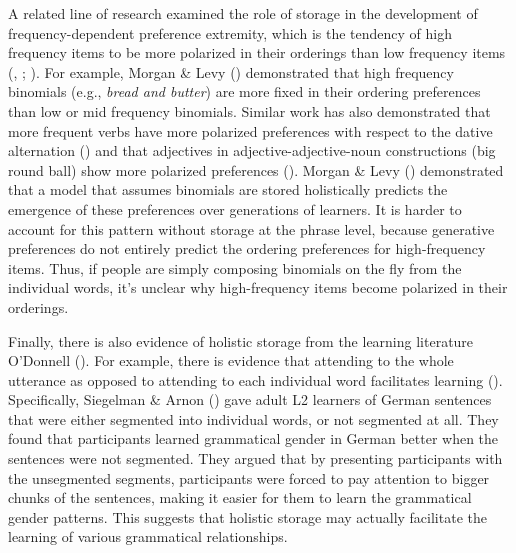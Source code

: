 \documentclass[
  12pt,
  letterpaper,
]{scrreprt}
\begin{document}
A related line of research examined the role of storage in the
development of frequency-dependent preference extremity, which is the
tendency of high frequency items to be more polarized in their orderings
than low frequency items
(,
;
). For example, Morgan \& Levy
()
demonstrated that high frequency binomials (e.g., \emph{bread and
butter}) are more fixed in their ordering preferences than low or mid
frequency binomials. Similar work has also demonstrated that more
frequent verbs have more polarized preferences with respect to the
dative alternation
() and that adjectives in adjective-adjective-noun
constructions (big round ball) show more polarized preferences
(). Morgan \& Levy
()
demonstrated that a model that assumes binomials are stored holistically
predicts the emergence of these preferences over generations of
learners. It is harder to account for this pattern without storage at
the phrase level, because generative preferences do not entirely predict
the ordering preferences for high-frequency items. Thus, if people are
simply composing binomials on the fly from the individual words, it's
unclear why high-frequency items become polarized in their orderings.

Finally, there is also evidence of holistic storage from the learning
literature O'Donnell
(). For
example, there is evidence that attending to the whole utterance as
opposed to attending to each individual word facilitates learning
(). Specifically, Siegelman \& Arnon
() gave adult L2
learners of German sentences that were either segmented into individual
words, or not segmented at all. They found that participants learned
grammatical gender in German better when the sentences were not
segmented. They argued that by presenting participants with the
unsegmented segments, participants were forced to pay attention to
bigger chunks of the sentences, making it easier for them to learn the
grammatical gender patterns. This suggests that holistic storage may
actually facilitate the learning of various grammatical relationships.
\end{document}
